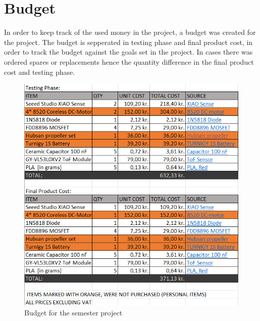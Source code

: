 \section{Budget}\label{appendix_budget}

In order to keep track of the used money in the project, a budget was created for the project. The budget is sepperated in testing phase and final product cost, in order to track the budget against the goals set in the project. In cases there was ordered spares or replacements hence the quantity difference in the final product cost and testing phase. 

\begin{figure}[H]
    \begin{center}
    \includegraphics[scale=0.7]{pictures/Budget.png}
    \end{center}
    \caption{Budget for the semester project}
    \label{fig:Surge_Current}
\end{figure}

